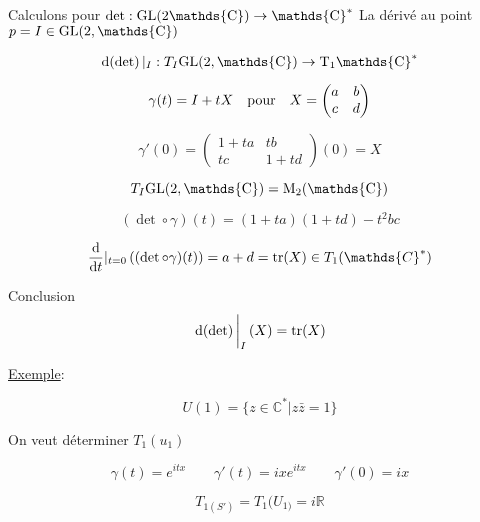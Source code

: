 Calculons pour \(\det: \rm{GL}(2 \mathds{C}) \to \mathds{C}^{*}\) 
La dérivé au point \(p = I \in \rm{GL}(2, \mathds{C})\)


\[ \dd (\det)|_I : T_I \rm{GL}(2, \mathds{C}) \to T_1 \mathds{C}^{*} \]

\[ \gamma(t) = I + tX \qq{pour} X = \begin{pmatrix} a & b \\ c & d  \end{pmatrix} \]

\[ \gamma'(0) = \begin{pmatrix} 1+ ta & tb \\ tc & 1 + td \end{pmatrix} (0) = X  \]

\[ T_I \rm{GL}(2, \mathds{C})= M_2(\mathds{C}) \]

\[ (\det \circ \gamma) (t) = (1+ta)(1+td) -t^{2}bc \]

\[ \dv{{}}{t} |_{t=0} \left( (\det \circ \gamma)(t) \right) = a+d = \tr(X) \in T_1 (\mathds{C}^{*}) \]

Conclusion \[ \eval{\dd (\det)}_{I} (X) = \tr(X) \]

\underline{Exemple}:

\[ U(1) = \{ z \in \mathds{C}^{*} | z\bar z = 1 \}  \]

On veut déterminer \(T_1(u_1)\)

\[ \gamma(t) = e^{itx} \qquad \gamma'(t) = i x e^{itx}\qquad \gamma'(0) = ix \]

\[ T_{1(S')} = T_1 (U_{1)} = i \mathds{R} \]




